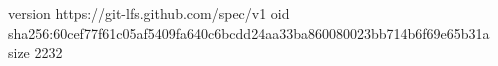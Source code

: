 version https://git-lfs.github.com/spec/v1
oid sha256:60cef77f61c05af5409fa640c6bcdd24aa33ba860080023bb714b6f69e65b31a
size 2232
